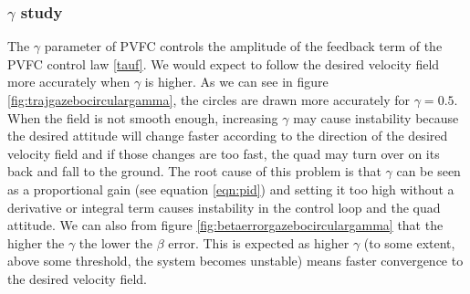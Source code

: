 \subsubsection{$\gamma$ study}
The $\gamma$ parameter of PVFC controls the amplitude of the feedback term of the PVFC control law \ref{tauf}.
We would expect to follow the desired velocity field more accurately when $\gamma$ is higher.
As we can see in figure \ref{fig:trajgazebocirculargamma}, the circles are drawn more accurately for $\gamma=0.5$.
When the field is not smooth enough, increasing $\gamma$ may cause instability because the desired attitude will change faster according to the direction of the desired
velocity field and if those changes are too fast, the quad may turn over on its back and fall to the ground. The root cause of this problem is that $\gamma$ can be seen as a proportional gain (see equation \ref{eqn:pid}) and setting it too high without a derivative or integral term causes instability in the control loop and the quad attitude.
We can also from figure \ref{fig:betaerrorgazebocirculargamma} that the higher the $\gamma$ the lower the $\beta$ error. This is expected as higher $\gamma$ (to some extent, above some threshold, the system becomes unstable) means faster convergence to the desired velocity field.

